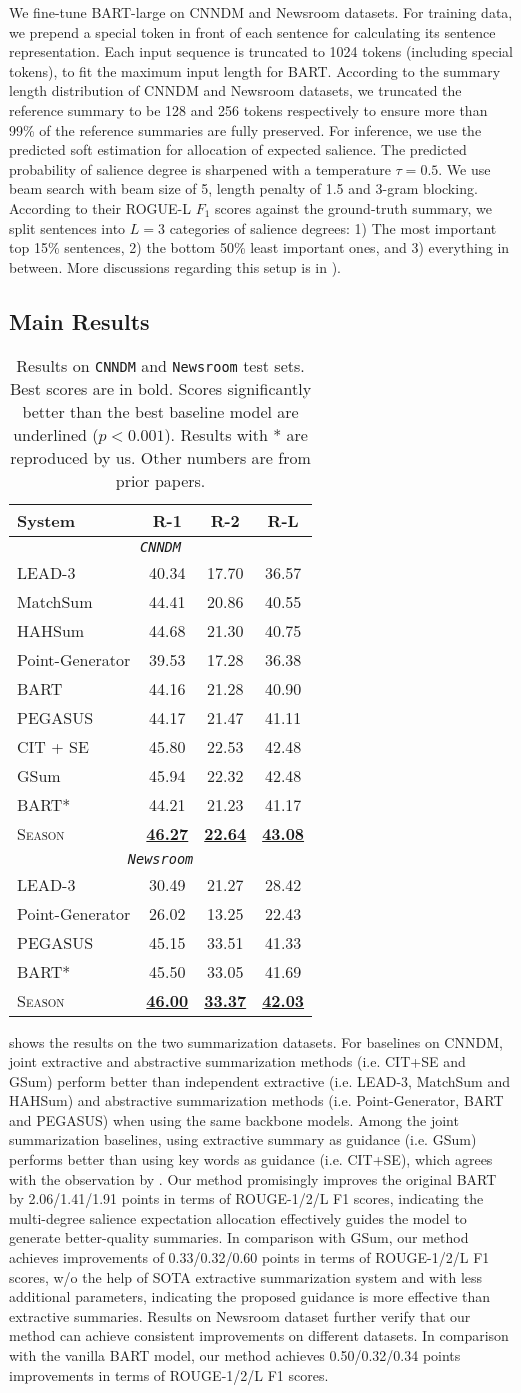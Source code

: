 \documentclass[11pt]{article}
\newcommand{\stitle}[1]{\vspace{1ex} \noindent{\bf #1.}}
\newcommand{\MODEL}{\mbox{\textsc{Season}}\xspace}
\newcommand{\TABLEMAIN}{
    \begin{table}[t!]
        \centering
        \small
        \begin{tabular}{lccc}
            \toprule 
            \textbf{System} & \textbf{R-1} & \textbf{R-2} & \textbf{R-L}  \\\midrule
            \multicolumn{4}{c}{\textit{\texttt{CNNDM}}} \\\midrule
            LEAD-3 & 40.34 & 17.70 & 36.57 \\
            MatchSum & 44.41 & 20.86 & 40.55 \\
            HAHSum & 44.68 & 21.30 & 40.75 \\ \midrule
            Point-Generator & 39.53 & 17.28 & 36.38 \\
            BART & 44.16 & 21.28 & 40.90 \\
            PEGASUS & 44.17 & 21.47 & 41.11 \\ 
            CIT + SE &45.80 & 22.53 &42.48  \\
            GSum & 45.94 & 22.32 & 42.48 \\\midrule
            BART* & 44.21 &21.23 &41.17 \\
            
            \MODEL &  \underline{\textbf{46.27}} & \underline{\textbf{22.64}} & \underline{\textbf{43.08}} \\
            \midrule \multicolumn{4}{c}{\textit{\texttt{Newsroom}}} \\\midrule
            LEAD-3 & 30.49 & 21.27 & 28.42 \\ \midrule
            Point-Generator & 26.02 & 13.25 & 22.43 \\
            PEGASUS & 45.15 & 33.51 & 41.33\\\midrule
            BART* & 45.50	&33.05	&41.69\\
            \MODEL &  \underline{\textbf{46.00}}	& \underline{\textbf{33.37}}	& \underline{\textbf{42.03}} \\
            \bottomrule
        \end{tabular}
        \caption{\small Results on \texttt{CNNDM} and \texttt{Newsroom} test sets.
        Best scores are in bold.  Scores significantly better than the best baseline model are underlined ($p<0.001$).
        Results with * are reproduced by us.
        Other numbers are from prior papers. 
        }
        \label{tab:main} 
        \vspace{-0.5em}
    \end{table}
}
\begin{document}
\stitle{Implementation details}
We fine-tune BART-large on CNNDM and Newsroom datasets.
For training data, we prepend a special token in front of each sentence for calculating its sentence representation.
Each input sequence is truncated to 1024 tokens (including special tokens), to fit the maximum input length for BART.
According to the summary length distribution of CNNDM and Newsroom datasets, we truncated the reference summary to be 128 and 256 tokens respectively to ensure more than 99\% of the reference summaries are fully preserved.
For inference, we use the predicted soft estimation for allocation of expected salience.
The predicted probability of salience degree is sharpened with a temperature $\tau=0.5$.
We use beam search with beam size of 5, length penalty of 1.5 and 3-gram blocking.
According to their ROGUE-L $F_1$ scores against the ground-truth summary, we split sentences into $L=3$ categories of salience degrees: 1) The most important top 15\% sentences, 2) the bottom 50\% least important ones, and 3) everything in between. More discussions regarding this setup is in ).






\subsection{Main Results}
\label{sec:main_result}
\TABLEMAIN
{} shows the results on the two summarization datasets.
For baselines on CNNDM, joint extractive and abstractive summarization methods (i.e. CIT+SE and GSum) perform better than independent extractive (i.e. LEAD-3, MatchSum and HAHSum) and abstractive summarization methods (i.e. Point-Generator, BART and PEGASUS) when using the same backbone models. 
Among the joint summarization baselines, using extractive summary as guidance (i.e. GSum) performs better than using key words as guidance (i.e. CIT+SE), which agrees with the observation by \citet{dou2021gsum}. 
Our method promisingly improves the
original BART by 2.06/1.41/1.91 points in terms of ROUGE-1/2/L F1 scores, indicating the multi-degree salience expectation allocation effectively guides the model to generate better-quality summaries.
In comparison with GSum, our method achieves improvements of 0.33/0.32/0.60 points in terms of ROUGE-1/2/L F1 scores, w/o the help of SOTA extractive summarization system and with less additional parameters, indicating the proposed guidance is more effective than extractive summaries.
Results on Newsroom dataset further verify that our method can achieve consistent improvements on different datasets. In comparison with the vanilla BART model, our method achieves 0.50/0.32/0.34 points improvements in terms of ROUGE-1/2/L F1 scores.
\end{document}
